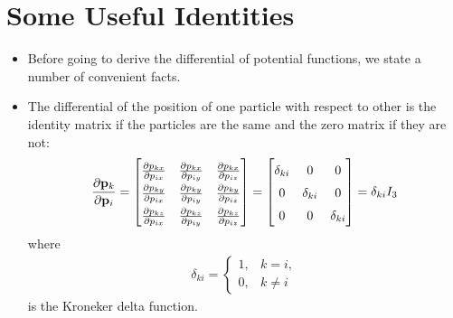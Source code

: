 \documentclass[10pt]{article}
\newcommand{\ve}[1]{\mathbf{#1}}
\begin{document}
  \section{Some Useful Identities}
  \begin{itemize}
    \item Before going to derive the differential of potential functions, we state a number of convenient facts.

    \item The differential of the position of one particle with respect to other is the identity matrix if the particles are the same and the zero matrix if they are not:
    \begin{align*}
      \renewcommand{\arraystretch}{1.5}
      \frac{\partial \ve{p}_k}{\partial \ve{p}_i}
      = \begin{bmatrix}
        \frac{\partial p_{kx}}{\partial p_{ix}} &
        \frac{\partial p_{kx}}{\partial p_{iy}} &
        \frac{\partial p_{kx}}{\partial p_{iz}} \\
        \frac{\partial p_{ky}}{\partial p_{ix}} &
        \frac{\partial p_{ky}}{\partial p_{iy}} &
        \frac{\partial p_{ky}}{\partial p_{iz}} \\
        \frac{\partial p_{kz}}{\partial p_{ix}} &
        \frac{\partial p_{kz}}{\partial p_{iy}} &
        \frac{\partial p_{kz}}{\partial p_{iz}} \\        
      \end{bmatrix}
      = \begin{bmatrix}
        \delta_{ki} & 0 & 0\\
        0 & \delta_{ki} & 0\\
        0 & 0 & \delta_{ki}
      \end{bmatrix}
      = \delta_{ki} I_3
    \end{align*}
    where
    \begin{align*}
      \delta_{ki} = \begin{cases}
        1, & k = i, \\
        0, & k \neq i
      \end{cases}
    \end{align*} 
    is the Kroneker delta function.


\end{itemize}
\end{document}
